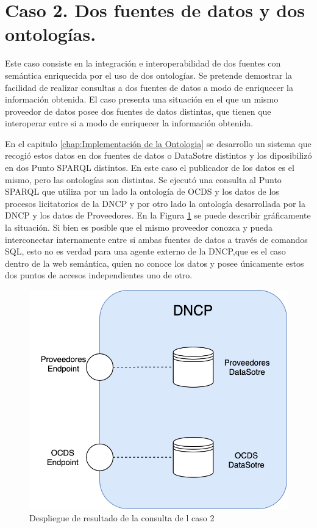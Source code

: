 \section{Caso 2. Dos fuentes de datos y dos ontologías.}
\label{section:caso2}

Este caso consiste en la integración e interoperabilidad de dos fuentes con semántica enriquecida por el uso de dos ontologías. Se pretende demostrar la facilidad de realizar consultas a dos fuentes de datos a modo de enriquecer la información obtenida. El caso presenta una situación en el que un mismo proveedor de datos posee dos fuentes de datos distintas, que tienen que interoperar entre si a modo de enriquecer la información obtenida.

En el capitulo \ref{chap:Implementación de la Ontologia} se desarrollo un sistema que recogió estos datos en dos fuentes de datos o DataSotre distintos y los diposibilizó en dos Punto SPARQL distintos. En este caso el publicador de los datos es el mismo, pero las ontologías son distintas. Se ejecutó una consulta al Punto SPARQL que utiliza por un lado la ontología de OCDS y los datos de los procesos licitatorios de la DNCP y por otro lado la ontología desarrollada por la DNCP y los datos de Proveedores.  En la Figura \ref{img:Diagramacaso2Endpoint} se puede describir gráficamente la situación. Si bien es posible que el mismo proveedor conozca y pueda interconectar internamente entre si ambas fuentes de datos a través de comandos SQL, esto no es verdad para una agente externo de la DNCP,que es el caso dentro de la web semántica, quien no conoce los datos y posee únicamente estos dos puntos de accesos independientes uno de otro.

 \begin{figure}[ht!]
    \centering
    \includegraphics[width=150mm]{figuras/Diagramas-Caso2-Ilustracion.png}
    \caption{Despliegue de resultado de la consulta de l caso 2}
    \label{img:Diagramacaso2Endpoint}
 \end{figure}


